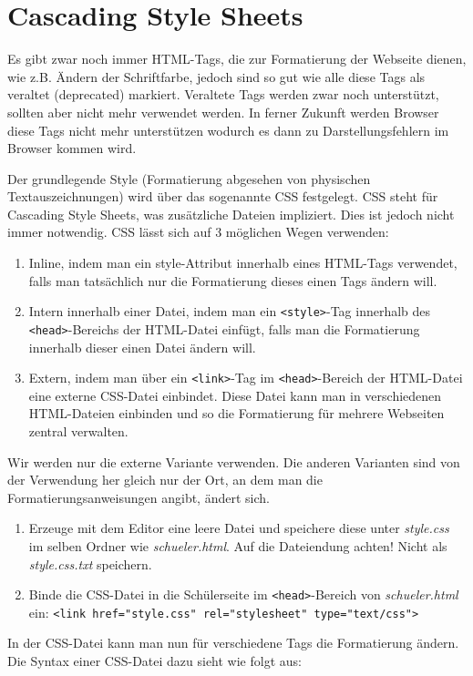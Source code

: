\section{Cascading Style Sheets}
Es gibt zwar noch immer HTML-Tags, die zur Formatierung der Webseite dienen, wie z.B. Ändern der Schriftfarbe, jedoch sind so gut wie alle diese Tags als veraltet (deprecated) markiert. Veraltete Tags werden zwar noch unterstützt, sollten aber nicht mehr verwendet werden. In ferner Zukunft werden Browser diese Tags nicht mehr unterstützen wodurch es dann zu Darstellungsfehlern im Browser kommen wird.

Der grundlegende Style (Formatierung abgesehen von physischen Textauszeichnungen) wird über das sogenannte CSS festgelegt. CSS steht für Cascading Style Sheets, was zusätzliche Dateien impliziert. Dies ist jedoch nicht immer notwendig. CSS lässt sich auf 3 möglichen Wegen verwenden:
\begin{enumerate}
    \item Inline, indem man ein style-Attribut innerhalb eines HTML-Tags verwendet, falls man tatsächlich nur die Formatierung dieses einen Tags ändern will.
    \item Intern innerhalb einer Datei, indem man ein \lstinline|<style>|-Tag innerhalb des \lstinline|<head>|-Bereichs der HTML-Datei einfügt, falls man die Formatierung innerhalb dieser einen Datei ändern will.
    \item Extern, indem man über ein  \lstinline|<link>|-Tag im \lstinline|<head>|-Bereich der HTML-Datei eine externe CSS-Datei einbindet. Diese Datei kann man in verschiedenen HTML-Dateien einbinden und so die Formatierung für mehrere Webseiten zentral verwalten.
\end{enumerate}

Wir werden nur die externe Variante verwenden. Die anderen Varianten sind von der Verwendung her gleich nur der Ort, an dem man die Formatierungsanweisungen angibt, ändert sich.

\begin{Exercise}[title=, label=CSS1]
    \begin{enumerate}
        \item Erzeuge mit dem Editor eine leere Datei und speichere diese unter \textit{style.css} im selben Ordner wie \textit{schueler.html}. Auf die Dateiendung achten! Nicht als \textit{style.css.txt} speichern.
        \item Binde die CSS-Datei in die Schülerseite im  \lstinline|<head>|-Bereich von \textit{schueler.html} ein:
        \lstinline|<link href="style.css" rel="stylesheet" type="text/css">|
    \end{enumerate}
\end{Exercise}
In der CSS-Datei kann man nun für verschiedene Tags die Formatierung ändern. Die Syntax einer CSS-Datei dazu sieht wie folgt aus:

